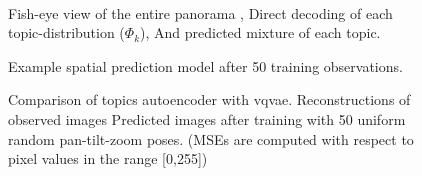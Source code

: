 \begin{figure}
\begin{minipage}{0.44\textwidth}
{        } \\
    \end{minipage}
    
    \caption{Example spatial prediction model after 50 training observations. \protect{}} Fish-eye view of the entire panorama \protect{}, Direct decoding of each topic-distribution ($\Phi_k$), And \protect{} predicted mixture of each topic.
    \label{fig:pano-24}
\end{figure}


\begin{figure}
    \begin{center}
    \end{center}
    \caption{ Comparison of topics autoencoder with vqvae.
    \protect{} Reconstructions of observed images
    \protect{} Predicted images after training with 50 uniform random pan-tilt-zoom poses.
    (MSEs are computed with respect to pixel values in the range [0,255])
    }
    \label{fig:vs_vqvae}
\end{figure}

